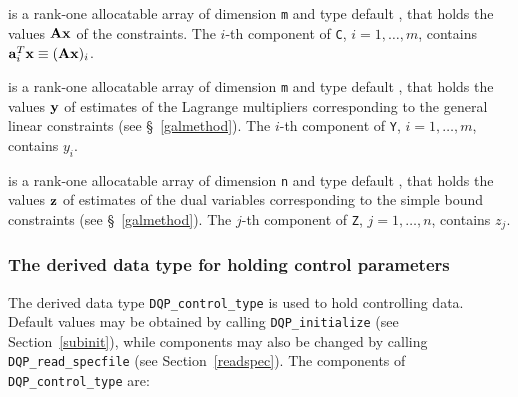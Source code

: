 \documentclass{galahad}
\newcommand{\packagename}{DQP}
\begin{document}
\begin{description}
 is a rank-one allocatable array of dimension {\tt m} and type default
\realdp, that holds
the values ${\mathbf{A}} {\mathbf{x}}$ of the constraints.
The $i$-th component of {\tt C}, $i = 1,  \ldots ,  m$, contains
${\mathbf{a}}_{i}^{T}{\mathbf{x}} \equiv ({\mathbf{A}} {\mathbf{x}})_{i}$.

 is a rank-one allocatable array of dimension {\tt m} and type
default \realdp, that holds
the values ${\mathbf{y}}$ of estimates  of the Lagrange multipliers
corresponding to the general linear constraints (see \S~\ref{galmethod}).
The $i$-th component of {\tt Y}, $i = 1,  \ldots ,  m$, contains $y_{i}$.

 is a rank-one allocatable array of dimension {\tt n} and type default
\realdp, that holds
the values ${\mathbf{z}}$ of estimates  of the dual variables
corresponding to the simple bound constraints (see \S~\ref{galmethod}).
The $j$-th component of {\tt Z}, $j = 1,  \ldots ,  n$, contains $z_{j}$.

\end{description}


\subsubsection{The derived data type for holding control
 parameters}\label{typecontrol}
The derived data type
{\tt \packagename\_control\_type}
is used to hold controlling data. Default values may be obtained by calling
{\tt \packagename\_initialize}
(see Section~\ref{subinit}),
while components may also be changed by calling
{\tt \packagename\_read\-\_specfile}
(see Section~\ref{readspec}).
The components of
{\tt \packagename\_control\_type}
are:



\end{document}
